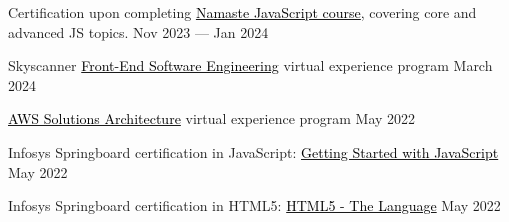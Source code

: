 Certification upon completing \href{https://namastedev.com/officialkiranmahajan/certificates/namaste-javascript}{\textcolor{black}{Namaste JavaScript course}}, covering core and advanced JS topics. \hfill Nov 2023 --- Jan 2024
 
 Skyscanner \href{https://forage-uploads-prod.s3.amazonaws.com/completion-certificates/Skyscanner/km4rw7dihDr3etqom_Skyscanner_Pd97Zax7EJjPcZEmo_1709363665958_completion_certificate.pdf}{\textcolor{black}{Front-End Software Engineering}} virtual experience program 
   \hfill March 2024


 \href{https://forage-uploads-prod.s3.amazonaws.com/completion-certificates/AWS/kkE9HyeNcw6rwCRGw_AWS%20APAC_Pd97Zax7EJjPcZEmo_1653728049277_completion_certificate.pdf}{\textcolor{black}{AWS Solutions Architecture}} virtual experience program \hfill May 2022

 Infosys Springboard certification in JavaScript: \href{https://drive.google.com/file/d/1UkqxfIVxQrNCxYwKFYY2eXQN0RVLOkSJ/view?usp=sharing}{\textcolor{black}{Getting Started with JavaScript}}  \hfill May 2022

  Infosys Springboard certification in HTML5: \href{https://drive.google.com/file/d/1PrqlwW1GEpTBas1Jib9TPh8FYw0uqB6k/view?usp=sharing}{\textcolor{black}{HTML5 - The Language}}  \hfill May 2022

